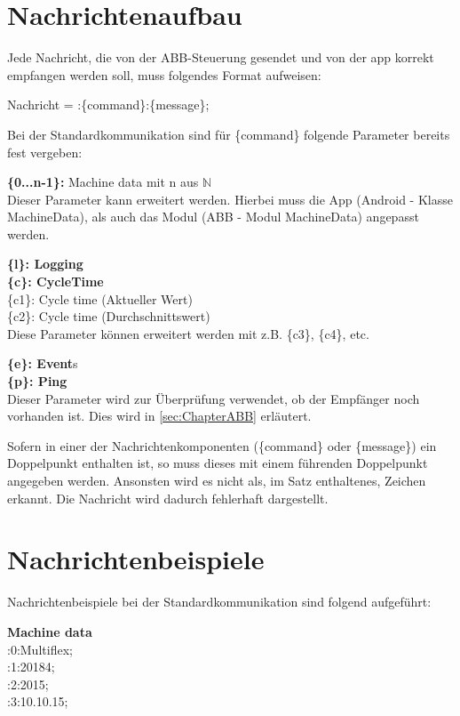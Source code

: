 \section{Nachrichtenaufbau}
\label{sec:Nachrichtenaufbau}
Jede Nachricht, die von der ABB-Steuerung gesendet und von der \gls{app} 
korrekt 
empfangen werden soll, muss folgendes Format aufweisen:

Nachricht = :\{command\}:\{message\};

Bei der Standardkommunikation sind für \{command\} folgende Parameter bereits 
fest vergeben:

\textbf{\{0...n-1\}:} Machine data mit n aus $\mathbb{N}$ \\
Dieser Parameter kann erweitert werden. Hierbei muss die App (Android - Klasse 
MachineData), als 
auch das Modul (ABB - Modul MachineData) angepasst werden.

\textbf{\{l\}: Logging} \\

\textbf{\{c\}: CycleTime} \\
\{c1\}: Cycle time (Aktueller Wert)\\
\{c2\}: Cycle time (Durchschnittswert)\\
Diese Parameter können erweitert werden mit z.B. \{c3\}, \{c4\}, etc.

\textbf{\{e\}: Event}s\\

\textbf{\{p\}: Ping}\\
Dieser Parameter wird zur Überprüfung verwendet, ob der Empfänger noch 
vorhanden ist. Dies wird in \ref{sec:ChapterABB} erläutert.

Sofern in einer der Nachrichtenkomponenten (\{command\} oder \{message\}) ein 
Doppelpunkt enthalten ist, so muss dieses mit einem führenden Doppelpunkt 
angegeben werden. Ansonsten wird es nicht als, im Satz enthaltenes, Zeichen 
erkannt. Die Nachricht wird dadurch fehlerhaft dargestellt.

\section{Nachrichtenbeispiele}
Nachrichtenbeispiele bei der Standardkommunikation sind folgend aufgeführt:

\textbf{Machine data}\\
:0:Multiflex; \\
:1:20184; \\
:2:2015; \\
:3:10.10.15; \\

